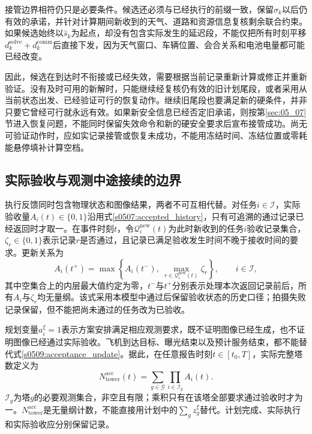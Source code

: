 接管边界相符仍只是必要条件。候选还必须与已经执行的前缀一致，保留$\sigma_k$以后仍有效的承诺，并针对计算期间新收到的天气、道路和资源信息复核剩余联合约束。如果候选始终以$\widehat s_k$为起点，却没有包含实际发生的延迟段，不能仅把所有时刻平移$d_k^{\mathrm{solve}}+d_k^{\mathrm{comm}}$后直接下发，因为天气窗口、车辆位置、会合关系和电池电量都可能已经改变。

因此，候选在到达时不衔接或已经失效，需要根据当前记录重新计算或修正并重新验证。没有及时可用的新解时，只能继续经复核仍有效的旧计划尾段，或者采用从当前状态出发、已经验证可行的恢复动作。继续旧尾段也要满足新的硬条件，并非只要它曾经可行就永远有效。如果新安全信息已经否定旧承诺，则按第\ref{sec:05_07}节进入恢复问题，不能同时保留失效命令和新的硬安全要求后宣布接管成功。尚无可验证动作时，应如实记录接管或恢复未成功，不能用冻结时间、冻结位置或零耗能悬停填补计算空档。

\subsection{实际验收与观测中途接续的边界}

执行反馈同时包含物理状态和图像结果，两者不可互相代替。对任务$i\in\mathcal I$，实际验收量$A_i(t)\in\{0,1\}$沿用式\eqref{s0507:accepted_history}，只有可追溯的通过记录已经返回时才取一。在事件时刻$t$，令$\mathcal Q_i^{\mathrm{new}}(t)$为此时新收到的任务$i$验收记录集合，$\zeta_r\in\{0,1\}$表示记录$r$是否通过，且记录已满足验收发生时间不晚于接收时间的要求。更新关系为
\begin{equation}
 A_i(t^+)=\max\left\{A_i(t^-),\
       \max_{r\in\mathcal Q_i^{\mathrm{new}}(t)}\zeta_r\right\},
 \qquad i\in\mathcal I,
 \label{s0509:acceptance_update}
\end{equation}
其中空集合上的内层最大值约定为零，$t^-$与$t^+$分别表示处理本次返回记录前后，所有$A_i$与$\zeta_r$均无量纲。该式采用本模型中通过后保留验收状态的历史口径；拍摄失败记录保留，但不能把尚未通过的任务改为已验收。

规划变量$a_i^\xi=1$表示方案安排满足相应观测要求，既不证明图像已经生成，也不证明图像已经通过实际验收。飞机到达目标、曝光结束以及预计服务结束，都不能替代式\eqref{s0509:acceptance_update}。据此，在任意报告时刻$t\in[t_0,T]$，实际完整塔数定义为
\begin{equation}
 N_{\mathrm{tower}}^{\mathrm{acc}}(t)
 =\sum_{g\in\mathcal G}\prod_{i\in\mathcal I_g}A_i(t).
 \label{s0509:actual_complete_towers}
\end{equation}
$\mathcal I_g$为塔$g$的必要观测集合，非空且有限；乘积只有在该塔全部要求通过验收时才为一。$N_{\mathrm{tower}}^{\mathrm{acc}}$是无量纲计数，不能直接用计划中的$\sum_g z_g^\xi$替代。计划完成、实际执行和实际验收应分别保留记录。

